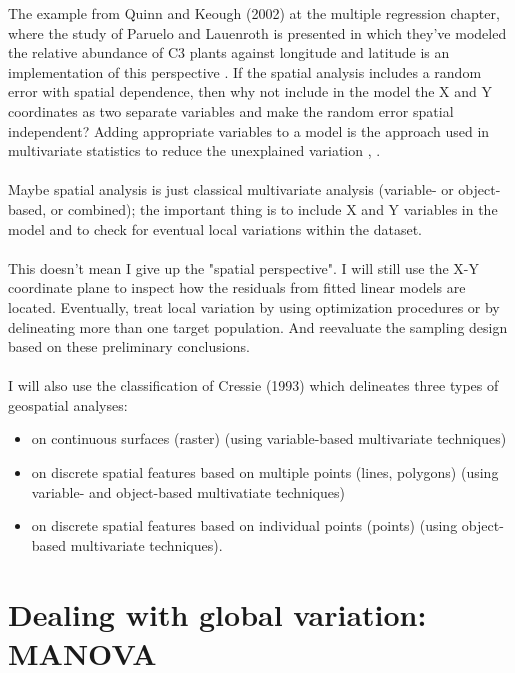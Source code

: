 \documentclass {article}
\begin{document}
The example from Quinn and Keough (2002) at the multiple regression chapter, where the study of Paruelo and Lauenroth is presented in which they've modeled the relative abundance of C3 plants against longitude and latitude is an implementation of this perspective \cite{paruelo_relative_1996}.
 If the spatial analysis includes a random error with spatial dependence, then why not include in the model the X and Y coordinates as two separate variables and make the random error spatial independent? Adding appropriate variables to a model is the approach used in multivariate statistics to reduce the unexplained variation \cite{quinn_experimental_2002} , \cite{carroll_mathematical_1997}.
\\
\\
Maybe spatial analysis is just classical multivariate analysis (variable- or object-based, or combined); the important thing is to include X and Y variables in the model and to check for eventual local variations within the dataset.
\\
\\
This doesn't mean I give up the "spatial perspective". I will still use the X-Y coordinate plane to inspect how the residuals from fitted linear models are located. Eventually, treat local variation by using optimization procedures or by delineating more than one target population. And reevaluate the sampling design based on these preliminary conclusions.
\\
\\
I will also use the classification of Cressie (1993) \cite{cressie_statistics_1993} which delineates three types of geospatial analyses:
\begin{itemize}
\item on continuous surfaces (raster) (using variable-based multivariate techniques)
\item on discrete spatial features based on multiple points (lines, polygons) (using variable- and object-based multivatiate techniques)
\item on discrete spatial features based on individual points (points) (using object-based multivariate techniques).
\end{itemize}

\section{Dealing with global variation: MANOVA}
\end{document}
